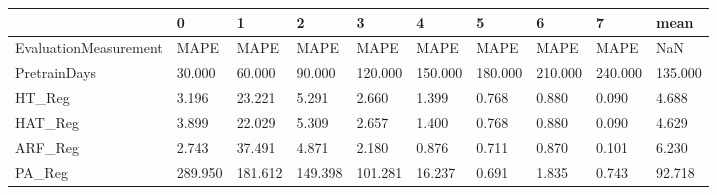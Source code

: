\begin{tabular}{llllllllll}
\toprule
{} &       0 &       1 &       2 &       3 &       4 &       5 &       6 &       7 &    mean \\
\midrule
EvaluationMeasurement &    MAPE &    MAPE &    MAPE &    MAPE &    MAPE &    MAPE &    MAPE &    MAPE &     NaN \\
PretrainDays          &  30.000 &  60.000 &  90.000 & 120.000 & 150.000 & 180.000 & 210.000 & 240.000 & 135.000 \\
HT\_Reg                &   3.196 &  23.221 &   5.291 &   2.660 &   1.399 &   0.768 &   0.880 &   0.090 &   4.688 \\
HAT\_Reg               &   3.899 &  22.029 &   5.309 &   2.657 &   1.400 &   0.768 &   0.880 &   0.090 &   4.629 \\
ARF\_Reg               &   2.743 &  37.491 &   4.871 &   2.180 &   0.876 &   0.711 &   0.870 &   0.101 &   6.230 \\
PA\_Reg                & 289.950 & 181.612 & 149.398 & 101.281 &  16.237 &   0.691 &   1.835 &   0.743 &  92.718 \\
\bottomrule
\end{tabular}
